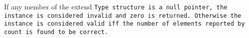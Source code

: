 If any member of the extend \tt{Type} structure is a null pointer,
the instance is considered invalid and zero is returned.
Otherwise the instance is considered valid iff the number
of elements reported by \tt{count} is found to be correct.
